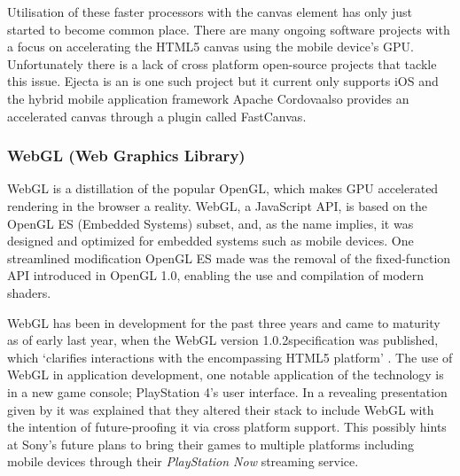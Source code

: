 \documentclass[final]{cmpreport}
\begin{document}
Utilisation of these faster processors with the canvas element has only just started to become common place. There are many ongoing software projects with a focus on accelerating the HTML5 canvas using the mobile device's GPU. Unfortunately there is a lack of cross platform open-source projects that tackle this issue. Ejecta is an is one such project but it current only supports iOS and the hybrid mobile application framework Apache Cordova\footnotemark also provides an accelerated canvas through a plugin called FastCanvas\footnotemark.


\subsubsection{WebGL (Web Graphics Library)}
WebGL is a distillation of the popular OpenGL, which makes GPU accelerated rendering in the browser a reality. WebGL, a JavaScript API, is based on the OpenGL ES (Embedded Systems) subset, and, as the name implies, it was designed and optimized for embedded systems such as mobile devices. One streamlined modification OpenGL ES made was the removal of the fixed-function API introduced in OpenGL 1.0, enabling the use and compilation of modern shaders.

WebGL has been in development for the past three years and came to maturity as of early last year, when the WebGL version 1.0.2\footnotemark specification was published, which `clarifies interactions with the encompassing HTML5 platform' \citep{Verry}. The use of WebGL in application development, one notable application of the technology is in a new game console; PlayStation 4's user interface. In a revealing presentation given by \cite{Olmstead} it was explained that they altered their stack to include WebGL with the intention of future-proofing it via cross platform support. This possibly hints at Sony's future plans to bring their games to multiple platforms including mobile devices through their \textit{PlayStation Now} streaming service.\footnotemark

\end{document}
